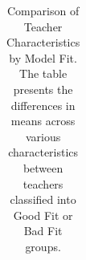 \documentclass[
  number,
  preprint,
  3p,
  onecolumn]{elsarticle}
\begin{document}
\begin{longtable}[]{@{}
  >{\raggedright\arraybackslash}p{}
  >{\centering\arraybackslash}p{}
  >{\centering\arraybackslash}p{}
  >{\centering\arraybackslash}p{}
  >{\centering\arraybackslash}p{}
  >{\centering\arraybackslash}p{}
  >{\centering\arraybackslash}p{}@{}}

\caption{\label{tbl-CBM-teachers-full}Comparison of Teacher
Characteristics by Model Fit. The table presents the differences in
means across various characteristics between teachers classified into
Good Fit or Bad Fit groups.}

\tabularnewline


\end{longtable}
\end{document}
